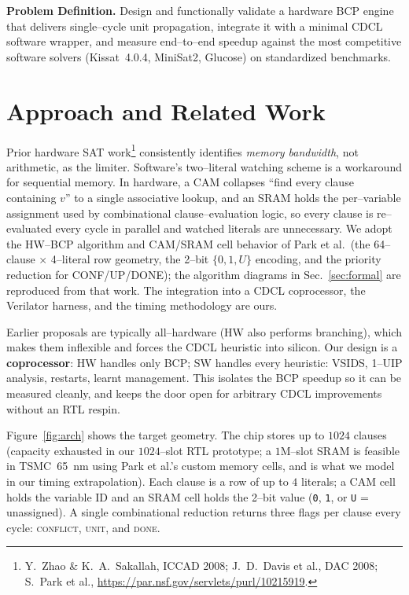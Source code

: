 \documentclass[11pt,letterpaper]{article}
\begin{document}
\noindent\textbf{Problem Definition.} Design and functionally validate a hardware
BCP engine that delivers single--cycle unit propagation, integrate
it with a minimal CDCL software wrapper, and measure end--to--end
speedup against the most competitive software solvers
(Kissat~4.0.4, MiniSat2, Glucose) on standardized benchmarks.

\section{Approach and Related Work}
Prior hardware SAT
work\footnote{Y.~Zhao \& K.~A.~Sakallah, ICCAD 2008; J.~D.~Davis et
al., DAC 2008; S.~Park et al.,
\url{https://par.nsf.gov/servlets/purl/10215919}.} consistently
identifies \emph{memory bandwidth}, not arithmetic, as the limiter.
Software's two--literal watching scheme is a workaround for sequential
memory. In hardware, a CAM collapses ``find every clause containing
$v$'' to a single associative lookup, and an SRAM holds the
per--variable assignment used by combinational clause--evaluation
logic, so every clause is re--evaluated every cycle in parallel
and watched literals are unnecessary. We adopt the HW--BCP algorithm
and CAM/SRAM cell behavior of Park et al.\ (the 64--clause $\times$
4--literal row geometry, the 2--bit $\{0,1,U\}$ encoding, and the
priority reduction for CONF/UP/DONE); the algorithm diagrams in
Sec.~\ref{sec:formal} are reproduced from that work. The integration
into a CDCL coprocessor, the Verilator harness, and the timing
methodology are ours.

Earlier proposals are typically all--hardware (HW also performs
branching), which makes them inflexible and forces the CDCL heuristic
into silicon. Our design is a \textbf{coprocessor}: HW handles only
BCP; SW handles every heuristic: VSIDS, 1--UIP analysis, restarts,
learnt management. This isolates the BCP speedup so it can be
measured cleanly, and keeps the door open for arbitrary CDCL
improvements without an RTL respin.

Figure~\ref{fig:arch} shows the target geometry. The chip stores up
to $1024$ clauses (capacity exhausted in our $1024$--slot RTL
prototype; a $1$M--slot SRAM is feasible in TSMC~65~nm using Park
et al.'s custom memory cells, and is what we model in our timing
extrapolation). Each clause is a row of up to $4$ literals; a CAM
cell holds the variable ID and an SRAM cell holds the 2--bit value
(\texttt{0}, \texttt{1}, or \texttt{U} = unassigned). A single
combinational reduction returns three flags per clause every cycle:
\textsc{conflict}, \textsc{unit}, and \textsc{done}.
\end{document}

